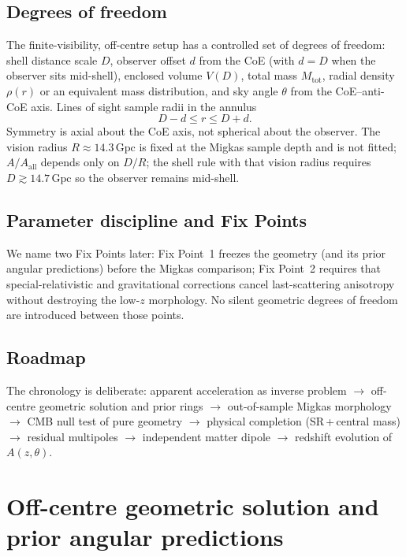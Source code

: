 \documentclass[11pt,a4paper]{article}
\begin{document}
\subsection{Degrees of freedom}

The finite-visibility, off-centre setup has a controlled set of degrees of freedom: shell distance scale \(D\), observer offset \(d\) from the CoE (with \(d=D\) when the observer sits mid-shell), enclosed volume \(V(D)\), total mass \(M_{\mathrm{tot}}\), radial density \(\rho(r)\) or an equivalent mass distribution, and sky angle \(\theta\) from the CoE--anti-CoE axis. Lines of sight sample radii in the annulus
\begin{equation}
D-d \le r \le D+d.
\end{equation}
Symmetry is axial about the CoE axis, not spherical about the observer. The vision radius \(R\approx14.3\,\mathrm{Gpc}\) is fixed at the Migkas sample depth and is not fitted; \(A/A_{\mathrm{all}}\) depends only on \(D/R\); the shell rule with that vision radius requires \(D\gtrsim14.7\,\mathrm{Gpc}\) so the observer remains mid-shell.

\subsection{Parameter discipline and Fix Points}

We name two Fix Points later: Fix Point~1 freezes the geometry (and its prior angular predictions) before the Migkas comparison; Fix Point~2 requires that special-relativistic and gravitational corrections cancel last-scattering anisotropy without destroying the low-\(z\) morphology. No silent geometric degrees of freedom are introduced between those points.

\subsection{Roadmap}

The chronology is deliberate: apparent acceleration as inverse problem \(\to\) off-centre geometric solution and prior rings \(\to\) out-of-sample Migkas morphology \(\to\) CMB null test of pure geometry \(\to\) physical completion (SR\,+\,central mass) \(\to\) residual multipoles \(\to\) independent matter dipole \(\to\) redshift evolution of \(A(z,\theta)\).

\section{Off-centre geometric solution and prior angular predictions}
\label{sec:geometry}
\end{document}
